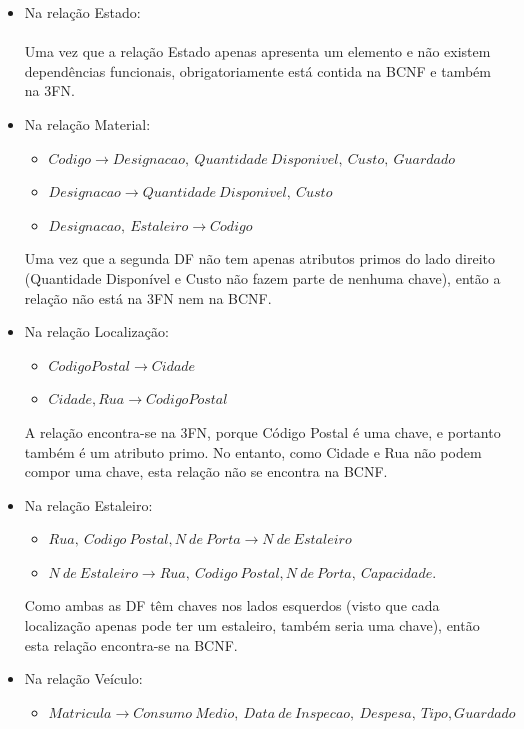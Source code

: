 \documentclass{report}
\begin{document}
\begin{itemize}
			\item Na relação Estado:
			\\ \\
			Uma vez que a relação Estado apenas apresenta um elemento e não existem 
			dependências funcionais, obrigatoriamente está contida na BCNF e também na 3FN.
			
			\item Na relação Material:
			\begin{itemize}
				\item $Codigo \rightarrow Designacao,\ Quantidade\ Disponivel,\ Custo,\ 
				Guardado$
				\item $Designacao \rightarrow Quantidade\ Disponivel,\ Custo$
				\item $Designacao,\ Estaleiro \rightarrow Codigo$
			\end{itemize}
			
			Uma vez que a segunda DF não tem apenas atributos primos do lado direito 
			(Quantidade Disponível e Custo não fazem parte de nenhuma chave), então a relação 
			não está na 3FN nem na BCNF.
			
			\item Na relação Localização:
			\begin{itemize}
				\item $Codigo Postal \rightarrow Cidade$
				\item $Cidade, Rua \rightarrow Codigo Postal$
			\end{itemize}
			
			A relação encontra-se na 3FN, porque Código Postal é uma chave, e portanto também 
			é um atributo primo. No entanto, como Cidade e Rua não podem compor uma chave, 
			esta relação não se encontra na BCNF.
			
			\newpage
			
			\item Na relação Estaleiro:
			\begin{itemize}
				\item $Rua,\ Codigo\ Postal, N\ de\ Porta \rightarrow N\ de\ Estaleiro$
				\item $N\ de\ Estaleiro \rightarrow Rua,\ Codigo\ Postal, N\ de\ Porta,\ 
				Capacidade.$
			\end{itemize}
			
			Como ambas as DF têm chaves nos lados esquerdos (visto que cada localização apenas 
			pode ter um estaleiro, também seria uma chave), então esta relação encontra-se na 
			BCNF.
			
			\item Na relação Veículo:
			\begin{itemize}
				\item $Matricula \rightarrow Consumo\ Medio,\ Data\ de\ Inspecao,\ Despesa,\ 
				Tipo, Guardado$
			\end{itemize}
			

\end{itemize}
\end{document}
